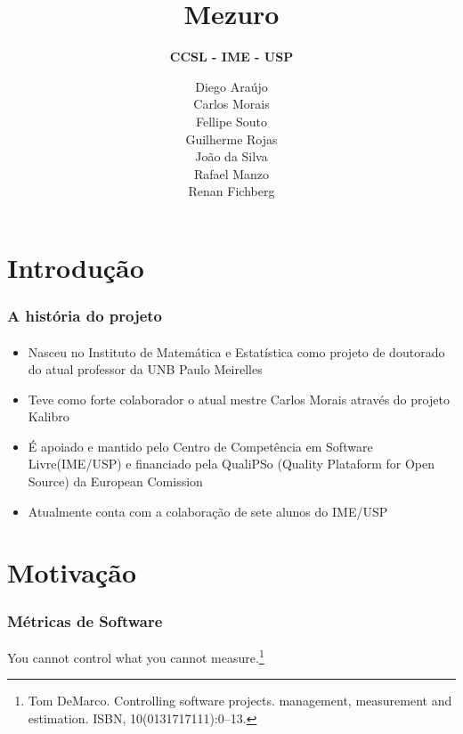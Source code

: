 \documentclass{beamer}
\title{
       \textbf{Mezuro} \\
      }
\subtitle{
		\textbf{CCSL - IME - USP}
		}
\author{
        Diego Araújo \\
        Carlos Morais \\
        Fellipe Souto \\
        Guilherme Rojas \\
        João da Silva \\
        Rafael Manzo \\
        Renan Fichberg
       }
\begin{document}
\maketitle

\section{Introdução}

\begin{frame}
  \frametitle{A história do projeto}
  \framesubtitle{}
  
  \begin{itemize}
    \item Nasceu no Instituto de Matemática e Estatística como projeto de doutorado do atual professor da UNB Paulo Meirelles
    \item Teve como forte colaborador o atual mestre Carlos Morais através do projeto Kalibro
    \item É apoiado e mantido pelo Centro de Competência em Software Livre(IME/USP) e financiado pela QualiPSo (Quality Plataform for Open Source) da European Comission
    \item Atualmente conta com a colaboração de sete alunos do IME/USP
 
  \end{itemize}

\end{frame}

\section{Motivação}
\begin{frame}

  \frametitle{Métricas de Software}
  
  You cannot control what you cannot measure.\footnote{Tom DeMarco. Controlling software projects. management, measurement and estimation. ISBN, 10(0131717111):0–13.}

\end{frame}
\end{document}
